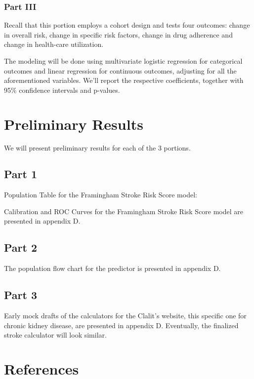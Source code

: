 \documentclass[a4paper,12pt]{article}
\begin{document}
		\subsubsection{Part III}
		Recall that this portion employs a cohort design and tests four outcomes: change in overall risk, change in specific risk factors, change in drug adherence and change in health-care utilization.
		
		The modeling will be done using multivariate logistic regression for categorical outcomes and linear regression for continuous outcomes, adjusting for all the aforementioned variables. We'll report the respective coefficients, together with 95\% confidence intervals and p-values.
		
	\section{Preliminary Results}
	We will present preliminary results for each of the 3 portions.

	\subsection{Part 1}

	Population Table for the Framingham Stroke Risk Score\cite{DAgostino1994} model:

	
	Calibration and ROC Curves for the Framingham Stroke Risk Score model are presented in appendix D.
	
	\subsection{Part 2}
	
	The population flow chart for the predictor is presented in appendix D.
	
	\subsection{Part 3}
	
	Early mock drafts of the calculators for the Clalit's website, this specific one for chronic kidney disease, are presented in appendix D. Eventually, the finalized stroke calculator will look similar.
	
	\section{References}
	
\end{document}
